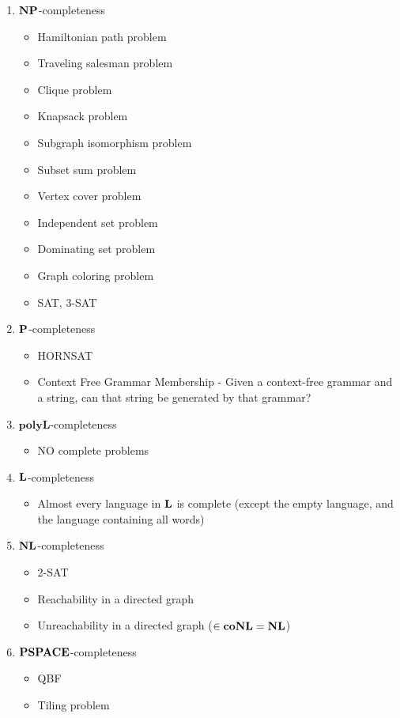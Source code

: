 \begin{enumerate}
    \item $\NP$-completeness
    \begin{itemize}
        \item Hamiltonian path problem
        \item Traveling salesman problem
        \item Clique problem
        \item Knapsack problem
        \item Subgraph isomorphism problem
        \item Subset sum problem
        \item Vertex cover problem
        \item Independent set problem
        \item Dominating set problem
        \item Graph coloring problem
        \item SAT, 3-SAT
    \end{itemize}
    \item $\P$-completeness
    \begin{itemize}
        \item HORNSAT
        \item Context Free Grammar Membership - Given a context-free grammar and a string, can that string be generated by that grammar?
    \end{itemize}
    \item $\textbf{polyL}$-completeness
    \begin{itemize}
        \item NO complete problems
    \end{itemize}
    \item $\L$-completeness
    \begin{itemize}
        \item Almost every language in $\L$ is complete (except the empty language, and the language containing all words)
    \end{itemize}
    \item $\NL$-completeness
    \begin{itemize}
        \item 2-SAT
        \item Reachability in a directed graph
        \item Unreachability in a directed graph ($\in \co\NL = \NL$)
    \end{itemize}
    \item $\PSPACE$-completeness
    \begin{itemize}
        \item QBF
        \item Tiling problem
    \end{itemize}
\end{enumerate}